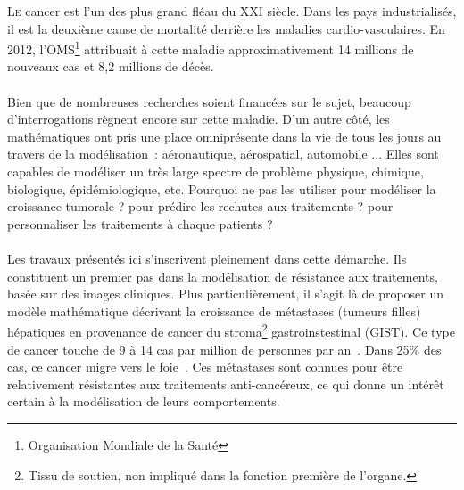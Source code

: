 \documentclass[main.tex]{subfiles}
\begin{document}

\lettrine{L}{e} cancer est l'un des plus grand fléau du XXI\ieme %
siècle.  Dans les pays industrialisés, il est la deuxième cause de mortalité derrière les maladies cardio-vasculaires. 
En 2012, l'OMS\footnote{Organisation Mondiale de la Santé} attribuait à cette maladie approximativement 14 millions de nouveaux cas et 8,2 millions de décès. 

\paragraph{}
 Bien que de nombreuses recherches soient financées sur le sujet, beaucoup d'interrogations   règnent encore sur cette maladie. D'un autre côté, les mathématiques ont pris une place omniprésente dans la vie de tous les jours au travers de la modélisation~: aéronautique, aérospatial, automobile ... Elles sont capables de modéliser un très large spectre de problème physique, chimique, biologique, épidémiologique, etc. Pourquoi ne pas les utiliser pour modéliser la croissance tumorale ? pour prédire les rechutes aux traitements ? pour personnaliser les traitements à chaque patients ? 
 
\paragraph{}
Les travaux présentés ici s'inscrivent pleinement dans cette démarche. Ils constituent un premier pas dans la modélisation de résistance aux traitements, basée sur des images cliniques. 
Plus particulièrement, il s'agit là de proposer un modèle mathématique décrivant la croissance de métastases (tumeurs filles) hépatiques en provenance de cancer du stroma\footnote{Tissu de soutien, non impliqué dans la fonction première de l'organe.} gastroinstestinal (GIST). Ce type de cancer touche de 9 à 14 cas par million de personnes par an~\cite{Nilsson2005}. Dans 25\% des cas, ce cancer migre vers le foie~\cite{Nilsson2005}. Ces métastases sont connues pour être relativement résistantes aux traitements anti-cancéreux, ce qui donne un intérêt certain à la modélisation de leurs comportements. 
\end{document}
